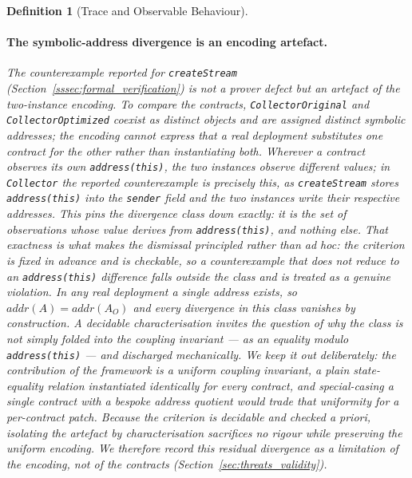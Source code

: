 \documentclass[manuscript,screen,review]{acmart}
\newenvironment{revisedblock}{\color{red}}{}
\newtheorem{definition}{Definition}
\begin{document}
\begin{definition}[Trace and Observable Behaviour]
\begin{revisedblock}
\paragraph{The symbolic-address divergence is an encoding artefact.}
The counterexample reported for \texttt{createStream}
(Section~\ref{sssec:formal_verification}) is not a prover defect but an artefact
of the two-instance encoding. To compare the contracts,
\texttt{CollectorOriginal} and \texttt{CollectorOptimized} coexist as distinct
objects and are assigned distinct symbolic addresses; the encoding cannot express
that a real deployment substitutes one contract for the other rather than
instantiating both. Wherever a contract observes its own \texttt{address(this)},
the two instances observe different values; in \texttt{Collector} the reported
counterexample is precisely this, as \texttt{createStream} stores
\texttt{address(this)} into the \texttt{sender} field and the two instances write
their respective addresses. This pins the divergence class down exactly: it is
the set of observations whose value derives from \texttt{address(this)}, and
nothing else. That exactness is what
makes the dismissal principled rather than ad hoc: the criterion is fixed in
advance and is checkable, so a counterexample that does not reduce to an
\texttt{address(this)} difference falls outside the class and is treated as a
genuine violation. In any real deployment a single address exists, so
$\mathit{addr}(A) = \mathit{addr}(A_O)$ and every divergence in this class
vanishes by construction. A decidable characterisation invites the question of
why the class is not simply folded into the coupling invariant --- as an equality
modulo \texttt{address(this)} --- and discharged mechanically. We keep it out
deliberately: the contribution of the framework is a \emph{uniform} coupling
invariant, a plain state-equality relation instantiated identically for every
contract, and special-casing a single contract with a bespoke address quotient
would trade that uniformity for a per-contract patch. Because the criterion is
decidable and checked a priori, isolating the artefact by characterisation
sacrifices no rigour while preserving the uniform encoding. We therefore record
this residual divergence as a limitation of the encoding, not of the contracts
(Section~\ref{sec:threats_validity}).


\end{revisedblock}
\end{definition}
\end{document}
